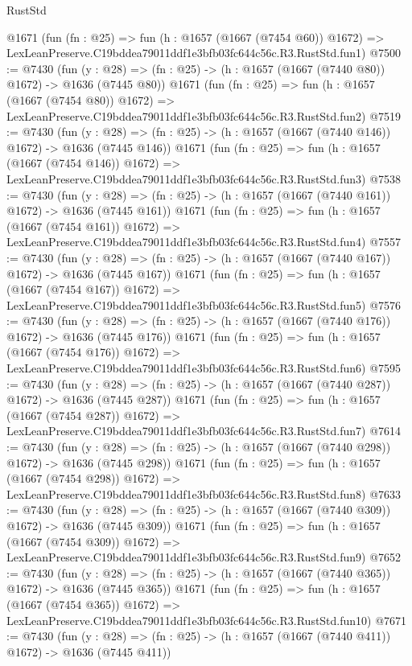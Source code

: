 \begin{lexlean}{RustStd}
\begin{coremodule}
    @1671
    (fun (fn : @25) =>
    fun (h : @1657 (@1667 (@7454 @60)) @1672) =>
    LexLeanPreserve.C19bddea79011ddf1e3bfb03fc644c56c.R3.RustStd.fun1)
@7500 := @7430
    (fun (y : @28) => (fn : @25) -> (h : @1657 (@1667 (@7440 @80)) @1672) -> @1636 (@7445 @80))
    @1671
    (fun (fn : @25) =>
    fun (h : @1657 (@1667 (@7454 @80)) @1672) =>
    LexLeanPreserve.C19bddea79011ddf1e3bfb03fc644c56c.R3.RustStd.fun2)
@7519 := @7430
    (fun (y : @28) => (fn : @25) -> (h : @1657 (@1667 (@7440 @146)) @1672) -> @1636 (@7445 @146))
    @1671
    (fun (fn : @25) =>
    fun (h : @1657 (@1667 (@7454 @146)) @1672) =>
    LexLeanPreserve.C19bddea79011ddf1e3bfb03fc644c56c.R3.RustStd.fun3)
@7538 := @7430
    (fun (y : @28) => (fn : @25) -> (h : @1657 (@1667 (@7440 @161)) @1672) -> @1636 (@7445 @161))
    @1671
    (fun (fn : @25) =>
    fun (h : @1657 (@1667 (@7454 @161)) @1672) =>
    LexLeanPreserve.C19bddea79011ddf1e3bfb03fc644c56c.R3.RustStd.fun4)
@7557 := @7430
    (fun (y : @28) => (fn : @25) -> (h : @1657 (@1667 (@7440 @167)) @1672) -> @1636 (@7445 @167))
    @1671
    (fun (fn : @25) =>
    fun (h : @1657 (@1667 (@7454 @167)) @1672) =>
    LexLeanPreserve.C19bddea79011ddf1e3bfb03fc644c56c.R3.RustStd.fun5)
@7576 := @7430
    (fun (y : @28) => (fn : @25) -> (h : @1657 (@1667 (@7440 @176)) @1672) -> @1636 (@7445 @176))
    @1671
    (fun (fn : @25) =>
    fun (h : @1657 (@1667 (@7454 @176)) @1672) =>
    LexLeanPreserve.C19bddea79011ddf1e3bfb03fc644c56c.R3.RustStd.fun6)
@7595 := @7430
    (fun (y : @28) => (fn : @25) -> (h : @1657 (@1667 (@7440 @287)) @1672) -> @1636 (@7445 @287))
    @1671
    (fun (fn : @25) =>
    fun (h : @1657 (@1667 (@7454 @287)) @1672) =>
    LexLeanPreserve.C19bddea79011ddf1e3bfb03fc644c56c.R3.RustStd.fun7)
@7614 := @7430
    (fun (y : @28) => (fn : @25) -> (h : @1657 (@1667 (@7440 @298)) @1672) -> @1636 (@7445 @298))
    @1671
    (fun (fn : @25) =>
    fun (h : @1657 (@1667 (@7454 @298)) @1672) =>
    LexLeanPreserve.C19bddea79011ddf1e3bfb03fc644c56c.R3.RustStd.fun8)
@7633 := @7430
    (fun (y : @28) => (fn : @25) -> (h : @1657 (@1667 (@7440 @309)) @1672) -> @1636 (@7445 @309))
    @1671
    (fun (fn : @25) =>
    fun (h : @1657 (@1667 (@7454 @309)) @1672) =>
    LexLeanPreserve.C19bddea79011ddf1e3bfb03fc644c56c.R3.RustStd.fun9)
@7652 := @7430
    (fun (y : @28) => (fn : @25) -> (h : @1657 (@1667 (@7440 @365)) @1672) -> @1636 (@7445 @365))
    @1671
    (fun (fn : @25) =>
    fun (h : @1657 (@1667 (@7454 @365)) @1672) =>
    LexLeanPreserve.C19bddea79011ddf1e3bfb03fc644c56c.R3.RustStd.fun10)
@7671 := @7430
    (fun (y : @28) => (fn : @25) -> (h : @1657 (@1667 (@7440 @411)) @1672) -> @1636 (@7445 @411))

\end{coremodule}
\end{lexlean}
